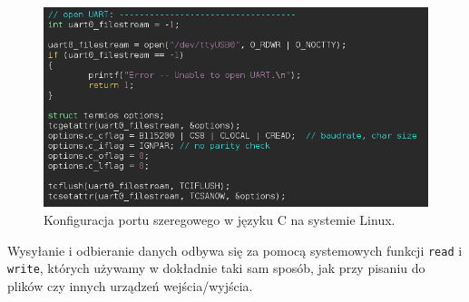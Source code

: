\begin{figure}
  \begin{center}
    \includegraphics[scale=0.5]{images/uart.png}
    \caption{Konfiguracja portu szeregowego w języku C na systemie Linux.}
    \label{fig:uart}
  \end{center}
\end{figure}

Wysyłanie i odbieranie danych odbywa się za pomocą systemowych funkcji \texttt{read} i \texttt{write}, których używamy w dokładnie taki sam sposób, jak przy pisaniu do plików czy innych urządzeń wejścia/wyjścia. 
